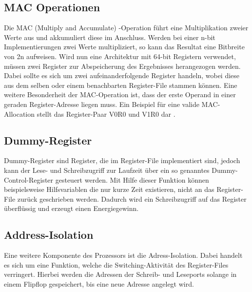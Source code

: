 \subsection{MAC Operationen}\label{subsec:macMode}
Die MAC (Multiply and Accumulate) -Operation führt eine Multiplikation zweier Werte aus und akkumuliert diese im Anschluss. Werden bei einer n-bit Implementierungen zwei Werte multipliziert, so kann das Resultat eine Bitbreite von 2n aufweisen. Wird nun eine Architektur mit 64-bit Registern verwendet, müssen zwei Register zur Abspeicherung des Ergebnisses herangezogen werden. Dabei sollte es sich um zwei aufeinanderfolgende Register handeln, wobei diese aus dem selben oder einem benachbarten Register-File stammen können. Eine weitere Besonderheit der MAC-Operation ist, dass der erste Operand in einer geraden Register-Adresse liegen muss. Ein Beispiel für eine valide MAC-Allocation stellt das  Register-Paar V0R0 und V1R0 dar \cite{meyer2007digital}.
  

\subsection{Dummy-Register}\label{subsec:dummy}
Dummy-Register sind Register, die im Register-File implementiert sind, jedoch kann der Lese- und Schreibzugriff zur Laufzeit über ein so genanntes Dummy-Control-Register gesteuert werden. Mit Hilfe dieser Funktion können beispielsweise Hilfsvariablen die nur kurze Zeit existieren, nicht an das Register-File zurück geschrieben werden. Dadurch wird ein Schreibzugriff auf das Register überflüssig und erzeugt einen Energiegewinn\cite{lukasglitches2017}.

\subsection{Address-Isolation}\label{subsec:add_iso}
Eine weitere Komponente des Prozessors ist die Adress-Isolation. Dabei handelt es sich um eine Funktion, welche die Switching-Aktivität des Register-Files verringert. Hierbei werden die Adressen der Schreib- und Leseports solange in einem Flipflop gespeichert, bis eine neue Adresse angelegt wird.\cite{lukasglitches2017}


